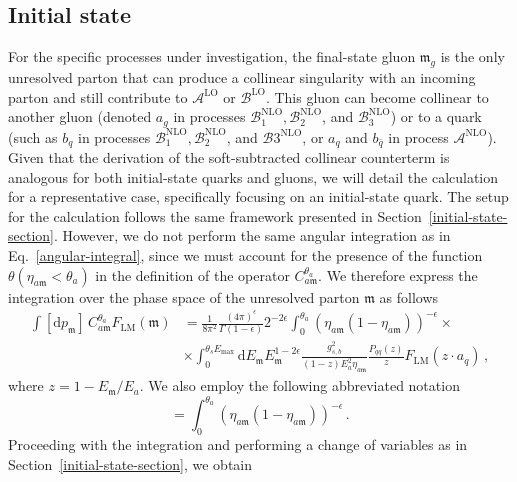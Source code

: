 \documentclass[a4paper, 12pt]{book}
\newcommand{\um}{\mathfrak{m}}
\begin{document}
\subsection{Initial state}
\label{initial-state-parameters-section}
For the specific processes under investigation, the final-state gluon $\um_g$ is the only unresolved parton that can produce a collinear singularity with an incoming parton and still contribute to $\mathcal{A}^{\mathrm{LO}}$ or $\mathcal{B}^{\mathrm{LO}}$. This gluon can become collinear to another gluon (denoted $a_g$ in processes $\mathcal{B}_1^{\mathrm{NLO}}, \mathcal{B}_2^{\mathrm{NLO}}$, and $\mathcal{B}_3^{\mathrm{NLO}}$) or to a quark (such as $b_q$ in processes $\mathcal{B}_1^{\mathrm{NLO}}, \mathcal{B}_2^{\mathrm{NLO}}$, and $\mathcal{B}3^{\mathrm{NLO}}$, or $a_q$ and $b_{\bar{q}}$ in process $\mathcal{A}^{\mathrm{NLO}}$). Given that the derivation of the soft-subtracted collinear counterterm is analogous for both initial-state quarks and gluons, we will detail the calculation for a representative case, specifically focusing on an initial-state quark. The setup for the calculation follows the same framework presented in Section~\ref{initial-state-section}. However, we do not perform the same angular integration as in Eq.~\ref{angular-integral}, since we must account for the presence of the function $\theta(\eta_{a\um}<\theta_a)$ in the definition of the operator $C_{a\um}^{\theta_a}$. We therefore express the integration over the phase space of the unresolved parton $\um$ as follows
\begin{equation}
  \begin{aligned}
  \int [\mathrm{d}p_\um]\, C_{a\um}^{\theta_a}  F_{\mathrm{LM}} (\um) &= \frac{1}{8\pi^2} \frac{(4\pi)^{\epsilon}}{\Gamma(1-\epsilon)} 2^{-2\epsilon} \int_0^{\theta_a} (\eta_{a\um}(1-\eta_{a\um}))^{-\epsilon} \times \\
  & \times \int_{0}^{\theta_s E_{\mathrm{max}}} \mathrm{d}E_\um E_\um^{1-2\epsilon} \frac{g_{s,b}^2}{(1-z)E_a^2 \eta_{a\um}} \frac{P_{qq}(z)}{z} F_{\mathrm{LM}} (z \cdot a_q) \, ,
  \end{aligned}
\end{equation}
where $z=1-E_\um/E_a$. We also employ the following abbreviated notation
\begin{equation}
  [\mathrm{d}\eta_{a\um \, \theta_a}] = \int_0^{\theta_a} (\eta_{a\um}(1-\eta_{a\um}))^{-\epsilon} \, .
\end{equation}
Proceeding with the integration and performing a change of variables as in Section~\ref{initial-state-section}, we obtain
\end{document}
